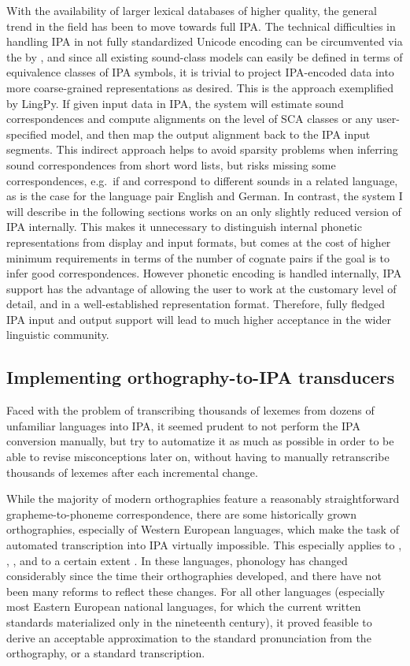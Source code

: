 With the availability of larger lexical databases of higher quality, the general trend in the field has been to move towards full IPA. The technical difficulties in handling IPA in not fully standardized Unicode encoding can be circumvented via the  by \cite{wells1995}, and since all existing sound-class models can easily be defined in terms of equivalence classes of IPA symbols, it is trivial to project IPA-encoded data into more coarse-grained representations as desired. This is the approach exemplified by LingPy. If given input data in IPA, the system will estimate sound correspondences and compute alignments on the level of SCA classes or any user-specified model, and then map the output alignment back to the IPA input segments. This indirect approach helps to avoid sparsity problems when inferring sound correspondences from short word lists, but risks missing some correspondences, e.g.\ if \ipa{[t]} and \ipa{[d]} correspond to different sounds in a related language, as is the case for the language pair English and German. In contrast, the system I will describe in the following sections works on an only slightly reduced version of IPA internally. This makes it unnecessary to distinguish internal phonetic representations from display and input formats, but comes at the cost of higher minimum requirements in terms of the number of cognate pairs if the goal is to infer good correspondences. However phonetic encoding is handled internally, IPA support has the advantage of allowing the user to work at the customary level of detail, and in a well-established representation format. Therefore, fully fledged IPA input and output support will lead to much higher acceptance in the wider linguistic community.

\subsection{Implementing orthography-to-IPA transducers}
Faced with the problem of transcribing thousands of lexemes from dozens of unfamiliar languages into IPA, it seemed prudent to not perform the IPA conversion manually, but try to automatize it as much as possible in order to be able to revise misconceptions later on, without having to manually retranscribe thousands of lexemes after each incremental change.

While the majority of modern orthographies feature a reasonably straightforward grapheme-to-phoneme correspondence, there are some historically grown orthographies, especially of Western European languages, which make the task of automated transcription into IPA virtually impossible. This especially applies to , , , and to a certain extent . In these languages, phonology has changed considerably since the time their orthographies developed, and there have not been many reforms to reflect these changes. For all other languages (especially most Eastern European national languages, for which the current written standards materialized only in the nineteenth century), it proved feasible to derive an acceptable approximation to the standard pronunciation from the orthography, or a standard transcription.


